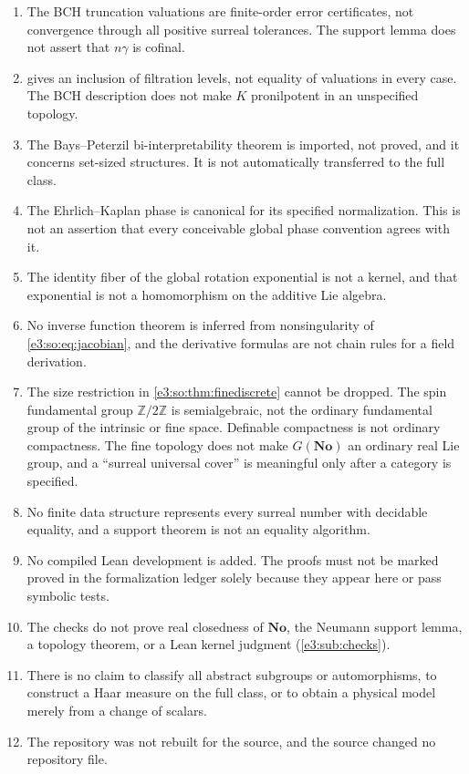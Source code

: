 \documentclass[11pt,letterpaper]{article}
\numberwithin{equation}{section}
\theoremstyle{definition}
\theoremstyle{remark}
\newcommand{\No}{\mathbf{No}}
\newcommand{\Z}{\mathbb Z}
\begin{document}
\begin{enumerate}[label=\textup{S\arabic*.},leftmargin=2.6em]
 \cref{e3:so:sec:globalexp}.
\item The BCH truncation valuations are finite-order error certificates, not
 convergence through all positive surreal tolerances. The support lemma does
 not assert that $n\gamma$ is cofinal.
\item {} gives an inclusion of filtration levels, not
 equality of valuations in every case. The BCH description does not make $K$
 pronilpotent in an unspecified topology.
\item The Bays--Peterzil bi-interpretability theorem is imported, not proved,
 and it concerns set-sized structures. It is not automatically transferred to
 the full class.
\item The Ehrlich--Kaplan phase is canonical for its specified normalization.
 This is not an assertion that every conceivable global phase convention agrees
 with it.
\item The identity fiber of the global rotation exponential is not a kernel,
 and that exponential is not a homomorphism on the additive Lie algebra.
\item No inverse function theorem is inferred from nonsingularity of
 \cref{e3:so:eq:jacobian}, and the derivative formulas are not chain rules for
 a field derivation.
\item The size restriction in \cref{e3:so:thm:finediscrete} cannot be dropped.
 The spin fundamental group $\Z/2\Z$ is semialgebraic, not the ordinary
 fundamental group of the intrinsic or fine space. Definable compactness is not
 ordinary compactness. The fine topology does not make $G(\No)$ an ordinary real
 Lie group, and a ``surreal universal cover'' is meaningful only after a
 category is specified.
\item No finite data structure represents every surreal number with decidable
 equality, and a support theorem is not an equality algorithm.
\item No compiled Lean development is added. The proofs must not be marked
 proved in the formalization ledger solely because they appear here or pass
 symbolic tests.
\item The checks do not prove real closedness of $\No$, the Neumann support
 lemma, a topology theorem, or a Lean kernel judgment (\cref{e3:sub:checks}).
\item There is no claim to classify all abstract subgroups or automorphisms,
 to construct a Haar measure on the full class, or to obtain a physical model
 merely from a change of scalars.
\item The repository was not rebuilt for the source, and the source changed no
 repository file.
\end{enumerate}
\end{document}
